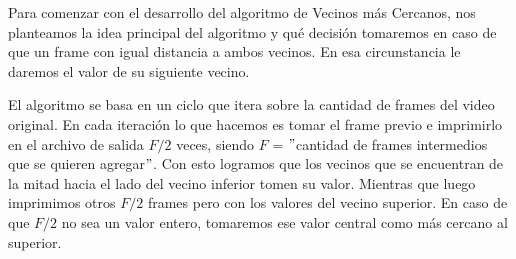 \par Para comenzar con el desarrollo del algoritmo de Vecinos más Cercanos, nos planteamos la idea principal del algoritmo y qu\'e decisi\'on tomaremos en caso de que un frame con igual distancia a ambos vecinos. En esa circunstancia le daremos el valor de su siguiente vecino.

\par El algoritmo se basa en un ciclo que itera sobre la cantidad de frames del video original. En cada iteraci\'on lo que hacemos es tomar el frame previo e imprimirlo en el archivo de salida $F / 2$ veces, siendo $F$ = $"$cantidad de frames intermedios que se quieren agregar$"$. Con esto logramos que los vecinos que se encuentran de la mitad hacia el lado del vecino inferior tomen su valor. Mientras que luego imprimimos otros $F / 2$ frames pero con los valores del vecino superior. En caso de que $F / 2$ no sea un valor entero, tomaremos ese valor central como más cercano al superior.